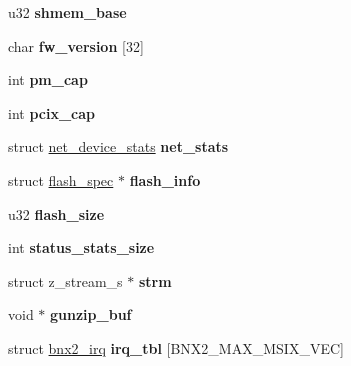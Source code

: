 \begin{DoxyCompactItemize}
\item 
\hypertarget{structbnx2_a5de34fa97f8877fe24516daaab94c598}{
u32 {\bfseries shmem\_\-base}}
\label{structbnx2_a5de34fa97f8877fe24516daaab94c598}

\item 
\hypertarget{structbnx2_a02a52cf882719bc78356aa374f583038}{
char {\bfseries fw\_\-version} \mbox{[}32\mbox{]}}
\label{structbnx2_a02a52cf882719bc78356aa374f583038}

\item 
\hypertarget{structbnx2_a79e513e2ec3f670042c01311c3404ed7}{
int {\bfseries pm\_\-cap}}
\label{structbnx2_a79e513e2ec3f670042c01311c3404ed7}

\item 
\hypertarget{structbnx2_a5d333ff1b16e2946e8e2f7c9e8f598cb}{
int {\bfseries pcix\_\-cap}}
\label{structbnx2_a5d333ff1b16e2946e8e2f7c9e8f598cb}

\item 
\hypertarget{structbnx2_a8d5eb79e4f5f6470bba6b68c473e99e3}{
struct \hyperlink{structnet__device__stats}{net\_\-device\_\-stats} {\bfseries net\_\-stats}}
\label{structbnx2_a8d5eb79e4f5f6470bba6b68c473e99e3}

\item 
\hypertarget{structbnx2_ae5a646272dfab2c52a5ac5faf1cd8eb5}{
struct \hyperlink{structflash__spec}{flash\_\-spec} $\ast$ {\bfseries flash\_\-info}}
\label{structbnx2_ae5a646272dfab2c52a5ac5faf1cd8eb5}

\item 
\hypertarget{structbnx2_a4fc75abbb5ff27a148ec4f1b287c1e30}{
u32 {\bfseries flash\_\-size}}
\label{structbnx2_a4fc75abbb5ff27a148ec4f1b287c1e30}

\item 
\hypertarget{structbnx2_a18abe2d1a7ffa27cfbb29d47866eed8f}{
int {\bfseries status\_\-stats\_\-size}}
\label{structbnx2_a18abe2d1a7ffa27cfbb29d47866eed8f}

\item 
\hypertarget{structbnx2_a2a78f7082da750c53ecec654928c62f9}{
struct z\_\-stream\_\-s $\ast$ {\bfseries strm}}
\label{structbnx2_a2a78f7082da750c53ecec654928c62f9}

\item 
\hypertarget{structbnx2_a178c57bc860674a817b9ecf7a76baedb}{
void $\ast$ {\bfseries gunzip\_\-buf}}
\label{structbnx2_a178c57bc860674a817b9ecf7a76baedb}

\item 
\hypertarget{structbnx2_a9870e44046a0f769c85ca39b02b93df4}{
struct \hyperlink{structbnx2__irq}{bnx2\_\-irq} {\bfseries irq\_\-tbl} \mbox{[}BNX2\_\-MAX\_\-MSIX\_\-VEC\mbox{]}}
\label{structbnx2_a9870e44046a0f769c85ca39b02b93df4}


\end{DoxyCompactItemize}
